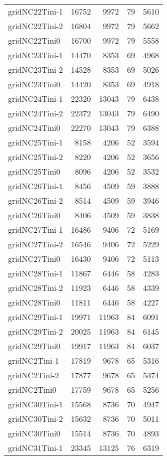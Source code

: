 \begin{longtable}{lrrrr}
gridNC22Tini-1 & 16752 & 9972 & 79 & 5610 \\
gridNC22Tini-2 & 16804 & 9972 & 79 & 5662 \\
gridNC22Tini0 & 16700 & 9972 & 79 & 5558 \\
gridNC23Tini-1 & 14470 & 8353 & 69 & 4968 \\
gridNC23Tini-2 & 14528 & 8353 & 69 & 5026 \\
gridNC23Tini0 & 14420 & 8353 & 69 & 4918 \\
gridNC24Tini-1 & 22320 & 13043 & 79 & 6438 \\
gridNC24Tini-2 & 22372 & 13043 & 79 & 6490 \\
gridNC24Tini0 & 22270 & 13043 & 79 & 6388 \\
gridNC25Tini-1 & 8158 & 4206 & 52 & 3594 \\
gridNC25Tini-2 & 8220 & 4206 & 52 & 3656 \\
gridNC25Tini0 & 8096 & 4206 & 52 & 3532 \\
gridNC26Tini-1 & 8456 & 4509 & 59 & 3888 \\
gridNC26Tini-2 & 8514 & 4509 & 59 & 3946 \\
gridNC26Tini0 & 8406 & 4509 & 59 & 3838 \\
gridNC27Tini-1 & 16486 & 9406 & 72 & 5169 \\
gridNC27Tini-2 & 16546 & 9406 & 72 & 5229 \\
gridNC27Tini0 & 16430 & 9406 & 72 & 5113 \\
gridNC28Tini-1 & 11867 & 6446 & 58 & 4283 \\
gridNC28Tini-2 & 11923 & 6446 & 58 & 4339 \\
gridNC28Tini0 & 11811 & 6446 & 58 & 4227 \\
gridNC29Tini-1 & 19971 & 11963 & 84 & 6091 \\
gridNC29Tini-2 & 20025 & 11963 & 84 & 6145 \\
gridNC29Tini0 & 19917 & 11963 & 84 & 6037 \\
gridNC2Tini-1 & 17819 & 9678 & 65 & 5316 \\
gridNC2Tini-2 & 17877 & 9678 & 65 & 5374 \\
gridNC2Tini0 & 17759 & 9678 & 65 & 5256 \\
gridNC30Tini-1 & 15568 & 8736 & 70 & 4947 \\
gridNC30Tini-2 & 15632 & 8736 & 70 & 5011 \\
gridNC30Tini0 & 15514 & 8736 & 70 & 4893 \\
gridNC31Tini-1 & 23345 & 13125 & 76 & 6319 \\

\end{longtable}
